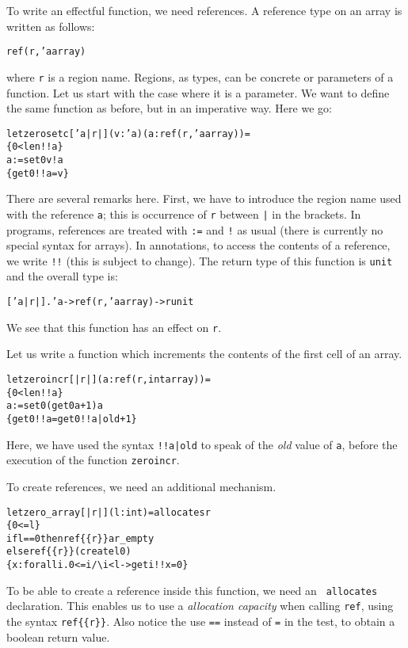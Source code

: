 \documentclass[a4paper]{scrreprt}
\begin{document}
To write an effectful function, we need references. A reference type on an
array is written as follows:
\begin{alltt}
  ref(r,'a array)
\end{alltt}
where {\tt r} is a region name. Regions, as types, can be concrete or
parameters of a function. Let us start with the case where it is a parameter.
We want to define the same function as before, but in an imperative way. Here
we go:
\begin{alltt}
  let zerosetc ['a|r|] (v : 'a) (a : ref(r,'a array)) =
    \{ 0 < len !!a \}
    a := set 0 v !a
    \{ get 0 !!a = v \}
\end{alltt}
There are several remarks here. First, we have to introduce the region name
used with the reference {\tt a}; this is occurrence of {\tt r} between {\tt |}
in the brackets. In programs, references are treated with {\tt :=} and {\tt !}
as usual (there is currently no special syntax for arrays). In annotations, to
access the contents of a reference, we write {\tt !!} (this is subject to
change). The return type of this function is {\tt unit} and the overall type
is:
\begin{alltt}
  ['a|r|]. 'a -> ref(r,'a array) ->{r} unit
\end{alltt}
We see that this function has an effect on {\tt r}.

Let us write a function which increments the contents of the first cell of an
array.
\begin{alltt}
  let zeroincr [|r|] (a : ref(r,int array)) =
    \{ 0 < len !!a \}
    a := set 0 (get 0 a +1) a
    \{ get 0 !!a = get 0 !!a|old + 1 \}
\end{alltt}
Here, we have used the syntax {\tt !!a|old} to speak of the {\em old} value of
{\tt a}, before the execution of the function {\tt zeroincr}.

To create references, we need an additional mechanism.
\begin{alltt}
  let zero_array [|r|] (l : int) = allocates r
    \{ 0 <= l \}
    if l == 0 then ref\{\{r\}\} ar_empty
    else ref\{\{r\}\} (create l 0)
    \{ x : forall i. 0 <= i \verb|/\| i < l -> get i !!x = 0 \}
\end{alltt}
To be able to create a reference inside this function, we need an {\tt
allocates} declaration. This enables us to use a {\em allocation capacity}
when calling {\tt ref}, using the syntax {\tt ref\{\{r\}\}}. Also notice the
use {\tt ==} instead of {\tt =} in the test, to obtain a boolean return value.
\end{document}
